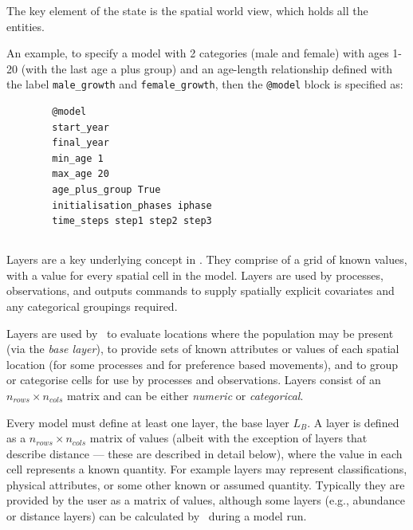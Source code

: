The key element of the state is the spatial world view, which holds all the entities.

An example, to specify a model with 2 categories (male and female) with ages 1-20 (with the last age a plus group) and an age-length relationship defined with the label \texttt{male\_growth} and \texttt{female\_growth}, then the \texttt{@model} block is specified as:
{\small{\begin{verbatim}
		@model
		start_year
		final_year
		min_age 1
		max_age 20
		age_plus_group True
		initialisation_phases iphase
		time_steps step1 step2 step3
\end{verbatim}}}

\subsection{\label{sec:layers}}

Layers are a key underlying concept in \IBM. They comprise of a grid of known values, with a value for every spatial cell in the model. Layers are used by processes, observations, and outputs commands to supply spatially explicit covariates and any categorical groupings required. 

Layers are used by \IBM\ to evaluate locations where the population may be present (via the \emph{base layer}), to provide sets of known attributes or values of each spatial location (for some processes and for preference based movements), and to group or categorise cells for use by processes and observations. Layers consist of an $n_{rows} \times n_{cols}$ matrix and can be either \emph{numeric} or \emph{categorical}. 

Every model must define at least one layer, the base layer $L_B$. A layer is defined as a $n_{rows} \times n_{cols}$ matrix of values (albeit with the exception of layers that describe distance --- these are described in detail below), where the value in each cell represents a known quantity. For example layers may represent classifications, physical attributes, or some other known or assumed quantity. Typically they are provided by the user as a matrix of values, although some layers (e.g., abundance or distance layers) can be calculated by \IBM\ during a model run. 

